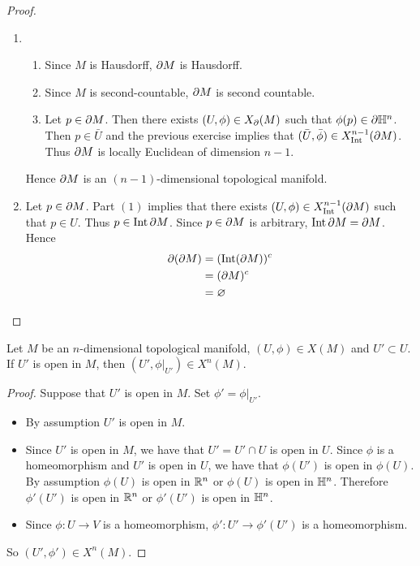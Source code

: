 \documentclass{book}
\begin{document}
	\begin{proof}\
		\begin{enumerate}
			\item 
			\begin{enumerate}
				\item Since $M$ is Hausdorff, $\partial M$ is Hausdorff.
				\item Since $M$ is second-countable, $\partial M$ is second countable. 
				\item Let $p \in \partial M$. Then there exists $(U, \phi) \in X_{\partial}(M)$ such that $\phi(p) \in \partial \mathbb{H}^n$. Then $p \in \bar{U}$ and the previous exercise implies that $(\bar{U}, \bar{\phi}) \in X^{n-1}_{\operatorname{Int}}(\partial M)$. Thus $\partial M$ is locally Euclidean of dimension $n-1$.
			\end{enumerate}
			Hence $\partial M$ is an $(n-1)$-dimensional topological manifold.
			\item Let $p \in \partial M$. Part $(1)$ implies that there exists $(U, \phi) \in X^{n-1}_{\operatorname{Int}}(\partial M)$ such that $p \in U$. Thus $p \in \operatorname{Int} \partial M$. Since $p \in \partial M$ is arbitrary, $\operatorname{Int} \partial M = \partial M$. Hence 
			\begin{align*}
				\partial (\partial M)
				& = (\operatorname{Int}(\partial M))^c \\
				& = (\partial M)^c \\
				& = \varnothing
			\end{align*} 
		\end{enumerate}
	\end{proof}

	\begin{ex}
		Let $M$ be an $n$-dimensional topological manifold, $(U, \phi) \in X(M)$ and $U' \subset U$. If $U'$ is open in $M$, then $(U', \phi|_{U'}) \in X^n(M)$. 
	\end{ex}
	
	\begin{proof}
		Suppose that $U'$ is open in $M$. Set $\phi' = \phi|_{U'}$. 
		\begin{itemize}
			\item By assumption $U'$ is open in $M$.
			\item Since $U'$ is open in $M$, we have that $U' = U' \cap U$ is open in $U$. Since $\phi$ is a homeomorphism and $U'$ is open in $U$, we have that $\phi(U')$ is open in $\phi(U)$. By assumption $\phi(U)$ is open in $\mathbb{R}^n$ or $\phi(U)$ is open in $\mathbb{H}^n$. Therefore $\phi'(U')$ is open in $\mathbb{R}^n$ or $\phi'(U')$ is open in $\mathbb{H}^n$.
			\item Since $\phi:U \rightarrow V$ is a homeomorphism, $\phi': U' \rightarrow \phi'(U')$ is a homeomorphism. 
		\end{itemize}
		So $(U', \phi') \in X^n(M)$. 
	\end{proof}
	
\end{document}
